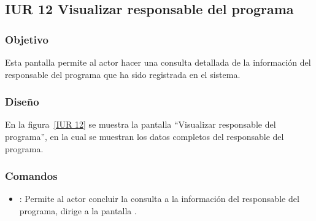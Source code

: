 \subsection{IUR 12 Visualizar responsable del programa}

\subsubsection{Objetivo}

	
    	Esta pantalla permite al actor  hacer una consulta detallada de la información del responsable del programa que ha sido registrada en el sistema.

\subsubsection{Diseño}


	En la figura~\ref{IUR 12} se muestra la pantalla ``Visualizar responsable del programa'', en la cual se muestran los datos completos del responsable del programa. 



\subsubsection{Comandos}
    \begin{itemize}
	\item {}: Permite al actor concluir la consulta a la información del responsable del programa, dirige a la pantalla .
    \end{itemize}

